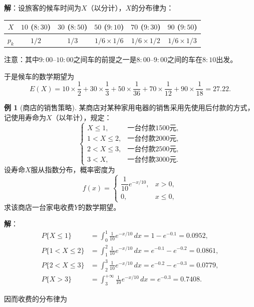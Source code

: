 \documentclass[11pt,a4paper]{report}
\theoremstyle{definition}
\newtheorem{example}{例}[chapter]
\begin{document}
\textbf{解}：设旅客的候车时间为$X$（以分计），$X$的分布律为：

\begin{table}[htbp]
\centering
\begin{tabular}{@{}cccccc@{}}
\toprule
$X$ & $10$ ($8{:}30$) & $30$ ($8{:}50$) & $50$ ($9{:}10$) & $70$ ($9{:}30$) & $90$ ($9{:}50$) \\
\midrule
$p_{k}$ & $1/2$ & $1/3$ & $1/6\times 1/6$ & $1/6\times 1/2$ & $1/6\times 1/3$ \\
\bottomrule
\end{tabular}
\end{table}

注意：其中$9{:}00$--$10{:}00$之间车的前提之一是$8{:}00$--$9{:}00$之间的车在$8{:}10$出发。

于是候车的数学期望为
\[
E(X)=10\times\frac{1}{2}+30\times\frac{1}{3}+50\times\frac{1}{36}+70\times\frac{1}{12}+90\times\frac{1}{18}=27.22.
\]

\begin{example}[商店的销售策略]
某商店对某种家用电器的销售采用先使用后付款的方式，记使用寿命为$X$（以年计），规定：
\[
\begin{cases}
X\leq 1, & \text{一台付款}1500\text{元},\\[0.3em]
1<X\leq 2, & \text{一台付款}2000\text{元},\\[0.3em]
2<X\leq 3, & \text{一台付款}2500\text{元},\\[0.3em]
3<X, & \text{一台付款}3000\text{元}.
\end{cases}
\]
设寿命$X$服从指数分布，概率密度为
\[
f(x)=
\begin{cases}
\dfrac{1}{10}e^{-x/10}, & x>0,\\[0.5em]
0, & x\leq 0,
\end{cases}
\]
求该商店一台家电收费$Y$的数学期望。
\end{example}

\textbf{解}：
\begin{align*}
P\{X\leq 1\}&=\int_{0}^{1}\frac{1}{10}e^{-x/10}\,dx=1-e^{-0.1}=0.0952,\\
P\{1<X\leq 2\}&=\int_{1}^{2}\frac{1}{10}e^{-x/10}\,dx=e^{-0.1}-e^{-0.2}=0.0861,\\
P\{2<X\leq 3\}&=\int_{2}^{3}\frac{1}{10}e^{-x/10}\,dx=e^{-0.2}-e^{-0.3}=0.0779,\\
P\{X>3\}&=\int_{3}^{+\infty}\frac{1}{10}e^{-x/10}\,dx=e^{-0.3}=0.7408.
\end{align*}

因而收费的分布律为
\end{document}
